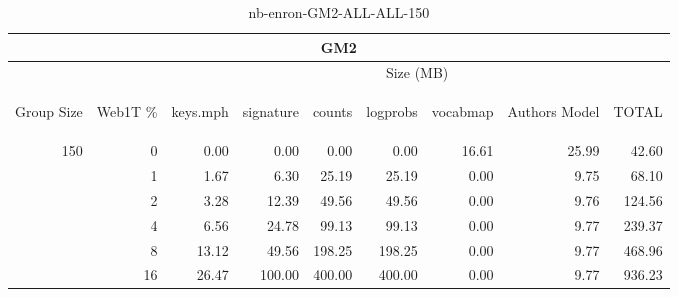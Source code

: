 \begin{center}
\begin{table}[htbp]
\begin{tabular}{ | r | r | r | r | r | r | r | r | r |}
\hline
\multicolumn{9}{|c|}{GM2}\\
\hline
 & & \multicolumn{7}{|c|}{Size (MB)}\\ \cline{3-9}
\begin{sideways}Group Size\end{sideways} & \begin{sideways}Web1T \% \end{sideways} & \begin{sideways}keys.mph\end{sideways} & \begin{sideways}signature\end{sideways} & \begin{sideways}counts\end{sideways} & \begin{sideways}logprobs\end{sideways} & \begin{sideways}vocabmap\end{sideways} & \begin{sideways}Authors Model \end{sideways} & \begin{sideways}TOTAL\end{sideways}\\
\hline
\multirow{5}{*}{150}
 & 0 & 0.00 & 0.00 & 0.00 & 0.00 & 16.61 & 25.99 & 42.60\\ \cline{2-9}
 & 1 & 1.67 & 6.30 & 25.19 & 25.19 & 0.00 & 9.75 & 68.10\\ \cline{2-9}
 & 2 & 3.28 & 12.39 & 49.56 & 49.56 & 0.00 & 9.76 & 124.56\\ \cline{2-9}
 & 4 & 6.56 & 24.78 & 99.13 & 99.13 & 0.00 & 9.77 & 239.37\\ \cline{2-9}
 & 8 & 13.12 & 49.56 & 198.25 & 198.25 & 0.00 & 9.77 & 468.96\\ \cline{2-9}
 & 16 & 26.47 & 100.00 & 400.00 & 400.00 & 0.00 & 9.77 & 936.23\\ \cline{2-9}
\hline
\end{tabular}
\caption{nb-enron-GM2-ALL-ALL-150}
\label{table:nb-enron-GM2-ALL-ALL-150}
\end{table}
\end{center}

